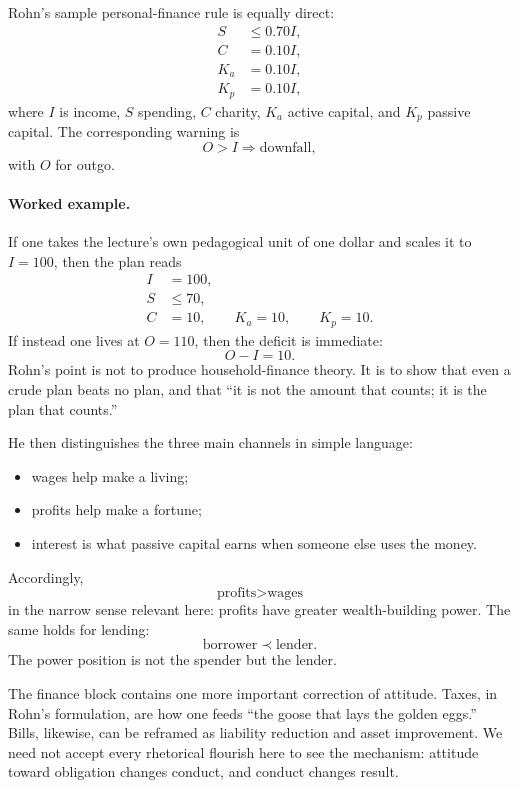 Rohn's sample personal-finance rule is equally direct:
\begin{align}
S &\le 0.70I,\\
C &= 0.10I,\\
K_a &= 0.10I,\\
K_p &= 0.10I,
\end{align}
where \(I\) is income, \(S\) spending, \(C\) charity, \(K_a\) active capital, and \(K_p\) passive capital. The corresponding warning is
\begin{equation}
O>I \Rightarrow \text{downfall},
\end{equation}
with \(O\) for outgo.

\paragraph{Worked example.} If one takes the lecture's own pedagogical unit of one dollar and scales it to \(I=100\), then the plan reads
\begin{align}
I &= 100,\\
S &\le 70,\\
C &= 10,\qquad K_a=10,\qquad K_p=10.
\end{align}
If instead one lives at \(O=110\), then the deficit is immediate:
\begin{equation}
O-I = 10.
\end{equation}
Rohn's point is not to produce household-finance theory. It is to show that even a crude plan beats no plan, and that ``it is not the amount that counts; it is the plan that counts.''

He then distinguishes the three main channels in simple language:
\begin{itemize}
\item wages help make a living;
\item profits help make a fortune;
\item interest is what passive capital earns when someone else uses the money.
\end{itemize}
Accordingly,
\begin{equation}
\text{profits}>\text{wages}
\end{equation}
in the narrow sense relevant here: profits have greater wealth-building power. The same holds for lending:
\begin{equation}
\text{borrower} \prec \text{lender}.
\end{equation}
The power position is not the spender but the lender.

The finance block contains one more important correction of attitude. Taxes, in Rohn's formulation, are how one feeds ``the goose that lays the golden eggs.'' Bills, likewise, can be reframed as liability reduction and asset improvement. We need not accept every rhetorical flourish here to see the mechanism: attitude toward obligation changes conduct, and conduct changes result.

